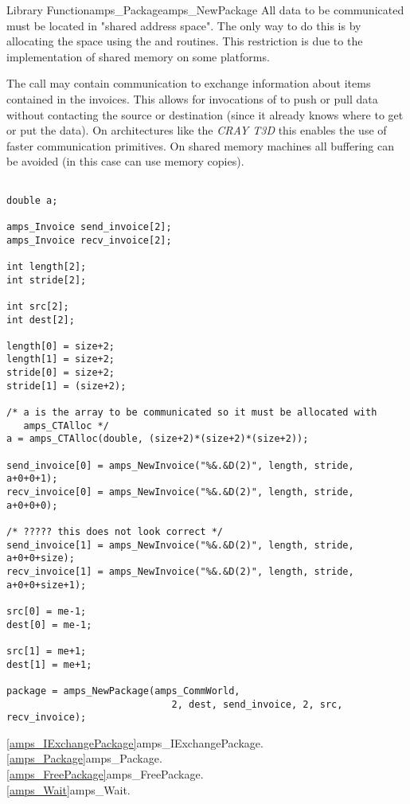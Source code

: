 \begin{deftypefn}{Library Function}{amps_Package}{amps\_NewPackage}
All data to be communicated must be located in "shared address space".
The only way to do this is by allocating the space using the
 and  routines.  This restriction
is due to the implementation of shared memory on some platforms.

The  call may contain communication to exchange
information about items contained in the invoices.  This allows for
invocations of  to push or pull data without
contacting the source or destination (since it already knows where to
get or put the data).  On architectures like the {\em CRAY T3D} this enables
the use of faster communication primitives.  On shared memory machines
all buffering can be avoided (in this case 
can use memory copies).

\begin{display}\begin{verbatim}

double a;

amps_Invoice send_invoice[2];
amps_Invoice recv_invoice[2];

int length[2];
int stride[2];

int src[2];
int dest[2];

length[0] = size+2;
length[1] = size+2;
stride[0] = size+2;
stride[1] = (size+2);

/* a is the array to be communicated so it must be allocated with
   amps_CTAlloc */
a = amps_CTAlloc(double, (size+2)*(size+2)*(size+2));

send_invoice[0] = amps_NewInvoice("%&.&D(2)", length, stride, a+0+0+1);
recv_invoice[0] = amps_NewInvoice("%&.&D(2)", length, stride, a+0+0+0);

/* ????? this does not look correct */
send_invoice[1] = amps_NewInvoice("%&.&D(2)", length, stride, a+0+0+size);
recv_invoice[1] = amps_NewInvoice("%&.&D(2)", length, stride, a+0+0+size+1);

src[0] = me-1;
dest[0] = me-1;

src[1] = me+1;
dest[1] = me+1;

package = amps_NewPackage(amps_CommWorld,
                             2, dest, send_invoice, 2, src, recv_invoice);

\end{verbatim}\end{display}

\SEEALSO
\vref{amps_IExchangePackage}{amps\_IExchangePackage}. \\
\vref{amps_Package}{amps\_Package}. \\
\vref{amps_FreePackage}{amps\_FreePackage}. \\
\vref{amps_Wait}{amps\_Wait}. \\

\end{deftypefn}

